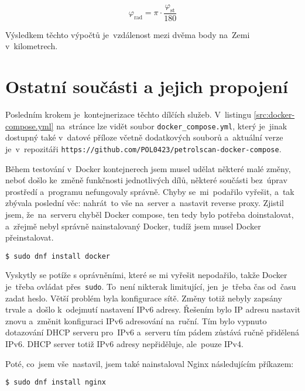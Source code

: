 \begin{equation}
    \label{eq:deg-to-rad}
    \varphi_{\text{rad}} = \pi \cdot \frac{\varphi_{\text{st}}}{180}
\end{equation}

Výsledkem těchto výpočtů je~vzdálenost mezi dvěma body na~Zemi v~kilometrech.

\section{Ostatní součásti a jejich propojení}
\label{sec:other-parts-and-stitching-services-together}

Posledním krokem je~kontejnerizace těchto dílčích služeb. V~listingu
\ref{src:docker-compose.yml} na~stránce \pageref{src:docker-compose.yml}
lze vidět soubor \texttt{docker\_compose.yml}, který je~jinak dostupný
také v~datové příloze včetně dodatkových souborů a~aktuální verze
je~v~repozitáři
\texttt{https://github.com/POL0423/petrolscan-docker-compose}.

Během testování v~Docker kontejnerech jsem musel udělat některé malé
změny, neboť došlo ke~změně funkčnosti jednotlivých dílů, některé součásti
bez~úprav prostředí a~programu nefungovaly správně. Chyby se~mi~podařilo
vyřešit, a~tak zbývala poslední věc: nahrát~to vše na~server a~nastavit
reverse proxy. Zjistil jsem, že~na~serveru chyběl Docker compose,
ten tedy bylo potřeba doinstalovat, a~zřejmě nebyl správně nainstalovaný
Docker, tudíž jsem musel Docker přeinstalovat.

\begin{verbatim}
$ sudo dnf install docker
\end{verbatim}

Vyskytly se potíže s oprávněními, které se mi vyřešit nepodařilo,
takže Docker je~třeba ovládat přes~\texttt{sudo}. To~není nikterak
limitující, jen~je~třeba čas od~času zadat heslo. Větší problém byla
konfigurace sítě. Změny totiž nebyly zapsány trvale a~došlo k~odejmutí
nastavení IPv6 adresy. Řešením bylo IP adresu nastavit znovu a~změnit
konfiguraci IPv6 adresování na~ruční. Tím bylo vypnuto dotazování DHCP
serveru pro~IPv6 a~serveru tím pádem zůstává ručně přidělená IPv6.
DHCP server totiž IPv6 adresy nepřiděluje, ale~pouze IPv4.

Poté, co~jsem vše~nastavil, jsem také nainstaloval Nginx následujícím
příkazem:

\begin{verbatim}
$ sudo dnf install nginx
\end{verbatim}

